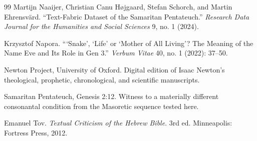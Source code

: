 \begin{thebibliography}{99}
Martijn Naaijer, Christian Canu Højgaard, Stefan Schorch, and Martin Ehrensvärd.
\newblock ``Text-Fabric Dataset of the Samaritan Pentateuch.''
\newblock \textit{Research Data Journal for the Humanities and Social Sciences} 9, no. 1 (2024).

Krzysztof Napora.
\newblock ```Snake', `Life' or `Mother of All Living'? The Meaning of the Name Eve and Its Role in Gen 3.''
\newblock \textit{Verbum Vitae} 40, no. 1 (2022): 37--50.

Newton Project, University of Oxford.
\newblock Digital edition of Isaac Newton's theological, prophetic, chronological, and scientific manuscripts.

\newblock Samaritan Pentateuch, Genesis 2:12.
\newblock Witness to a materially different consonantal condition from the Masoretic sequence tested here.

Emanuel Tov.
\newblock \textit{Textual Criticism of the Hebrew Bible}.
\newblock 3rd ed. Minneapolis: Fortress Press, 2012.

\end{thebibliography}


